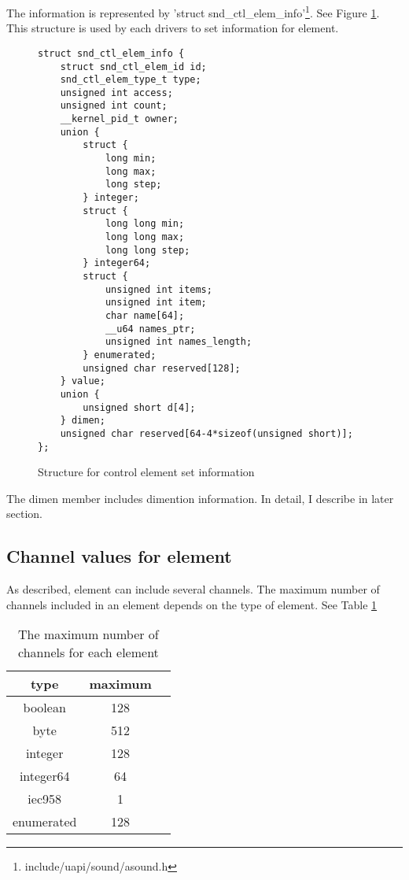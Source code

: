 \documentclass[onecolumn]{article}
\begin{document}
The information is represented by 'struct snd\_ctl\_elem\_info'\footnote{include/uapi/sound/asound.h}. See Figure \ref{fig:element-set-info-structure}. This structure is used by each drivers to set information for element.

\begin{figure}[htbp]
\small
\begin{verbatim}
struct snd_ctl_elem_info {
    struct snd_ctl_elem_id id;
    snd_ctl_elem_type_t type;
    unsigned int access;
    unsigned int count;
    __kernel_pid_t owner;
    union {
        struct {
            long min;
            long max;
            long step;
        } integer;
        struct {
            long long min;
            long long max;
            long long step;
        } integer64;
        struct {
            unsigned int items;
            unsigned int item;
            char name[64];
            __u64 names_ptr;
            unsigned int names_length;
        } enumerated;
        unsigned char reserved[128];
    } value;
    union {
        unsigned short d[4];
    } dimen;
    unsigned char reserved[64-4*sizeof(unsigned short)];
};
\end{verbatim}
\caption{{Structure for control element set information}}
\label{fig:element-set-info-structure}
\end{figure}

The dimen member includes dimention information. In detail, I describe in later section.

\subsection{Channel values for element}

As described, element can include several channels. The maximum number of channels included in an element depends on the type of element. See Table \ref{tbl:max-channels}

\begin{table}[H]
        \centering
        \caption{{The maximum number of channels for each element}}
        \label{tbl:max-channels}
        \begin{tabular}{ccc} \toprule
		type & maximum \\ \midrule
		boolean & 128 \\
		byte & 512 \\
		integer & 128 \\
		integer64 & 64 \\
		iec958 & 1 \\
		enumerated & 128 \\ \bottomrule
        \end{tabular}
\end{table}
\end{document}
